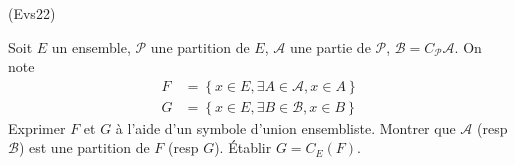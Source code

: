 \begin{tiny}(Evs22)\end{tiny} Soit $E$ un ensemble, $\mathcal{P}$ une partition de $E$, $\mathcal{A}$ une partie de $\mathcal{P}$,
$\mathcal{B}=C_{\mathcal{P}}\mathcal{A}$. On note
\begin{align*}
F &=\left\{ x\in E,\exists A\in \mathcal{A},x\in A\right\}  \\
G &= \left\{ x\in E,\exists B\in \mathcal{B},x\in B\right\}
\end{align*}
Exprimer $F$ et $G$ {\`a} l'aide d'un symbole d'union ensembliste. Montrer que $\mathcal{A}$ (resp $\mathcal{B}$) est une partition
de $F$ (resp $G$). {\'E}tablir $G=C_{E}(F)$.